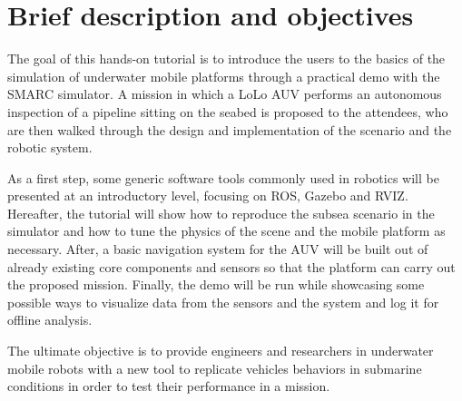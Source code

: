 \documentclass[
10pt, %
a4paper, %
oneside, %
BCOR5mm, %
]{scrartcl}
\begin{document}
\let\thefootnote\relax{}




 

\section{Brief description and objectives}
\label{sec:description}
The goal of this hands-on tutorial is to introduce the users to the basics of the simulation of underwater mobile platforms through a practical demo with the SMARC simulator.
A mission in which a LoLo AUV performs an autonomous inspection of a pipeline sitting on the seabed is proposed to the attendees, who are then walked through the design and implementation of the scenario and the robotic system.

As a first step, some generic software tools commonly used in robotics will be presented at an introductory level, focusing on ROS, Gazebo and RVIZ.
Hereafter, the tutorial will show how to reproduce the subsea scenario in the simulator and how to tune the physics of the scene and the mobile platform as necessary.
After, a basic navigation system for the AUV will be built out of already existing core components and sensors so that the platform can carry out the proposed mission.
Finally, the demo will be run while showcasing some possible ways to visualize data from the sensors and the system and log it for offline analysis.

The ultimate objective is to provide engineers and researchers in underwater mobile robots with a new tool to replicate vehicles behaviors in submarine conditions in order to test their performance in a mission. 
\\
\end{document}
